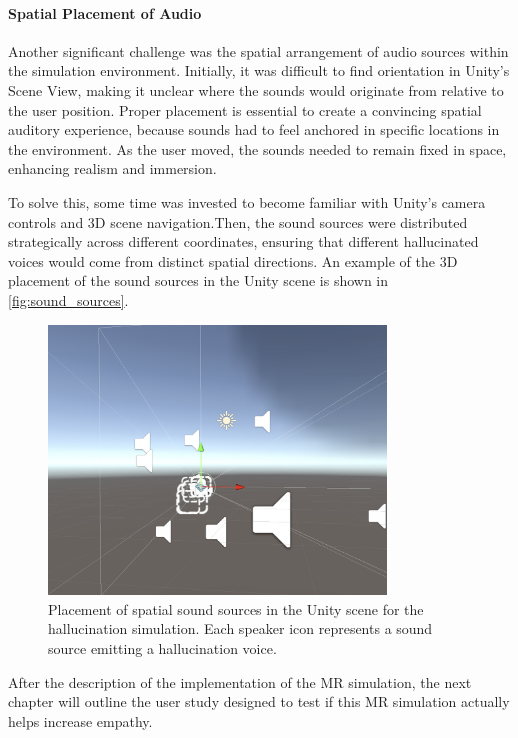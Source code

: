 \paragraph{Spatial Placement of Audio} 
Another significant challenge was the spatial arrangement of audio sources within the simulation environment. Initially, it was difficult to find orientation in Unity's Scene View, making it unclear where the sounds would originate from relative to the user position. Proper placement is essential to create a convincing spatial auditory experience, because sounds had to feel anchored in specific locations in the environment. As the user moved, the sounds needed to remain fixed in space, enhancing realism and immersion.

\vspace{1em}

To solve this, some time was invested to become familiar with Unity's camera controls and 3D scene navigation.Then, the sound sources were distributed strategically across different coordinates, ensuring that different hallucinated voices would come from distinct spatial directions. An example of the 3D placement of the sound sources in the Unity scene is shown in \autoref{fig:sound_sources}.

\begin{figure}[htbp] \centering \includegraphics[width=0.8\textwidth]{../../Figures/unity-scene.png} \caption{Placement of spatial sound sources in the Unity scene for the hallucination simulation. Each speaker icon represents a sound source emitting a hallucination voice.} \label{fig:sound_sources} \end{figure}

\vspace{1em}

After the description of the implementation of the MR simulation, the next chapter will outline the user study designed to test if this MR simulation actually helps increase empathy.